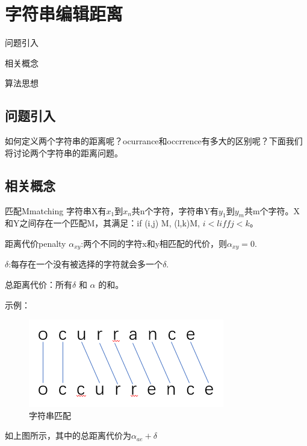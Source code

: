\chapter{字符串编辑距离}

\begin{introduction}
	\item 问题引入
	\item 相关概念
	\item 算法思想
\end{introduction}

\section{问题引入}
如何定义两个字符串的距离呢？ocurrance和occrrence有多大的区别呢？下面我们将讨论两个字符串的距离问题。
\section{相关概念}
\begin{definition}{匹配M}{matching}
字符串X有$x_1$到$x_n$共n个字符，字符串Y有$y_1$到$y_m$共m个字符。X和Y之间存在一个匹配M，其满足：if (i,j) \in M, (l,k)\in M, $i<l iff j<k$。
\end{definition}





\begin{definition}{距离代价}{penalty}
$\alpha_{xy}$:两个不同的字符x和y相匹配的代价，则$\alpha_{xy}=0$.

$\delta$:每存在一个没有被选择的字符就会多一个$\delta$.

总距离代价：所有$\delta$ 和 $\alpha$ 的和。
\end{definition}

示例：

\begin{figure}[htb]
	\centering
	\includegraphics[scale=0.6]{image/connect1.png}
	\caption{字符串匹配}\label{fig:connect1}
\end{figure}
如上图所示，其中的总距离代价为$\alpha_{ae} + \delta$

